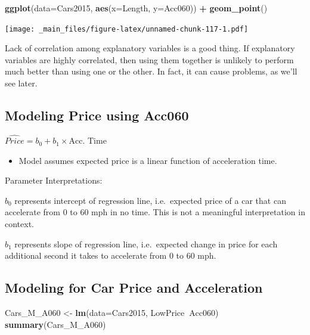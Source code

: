 \documentclass[]{book}
\newenvironment{Shaded}{\begin{snugshade}}{\end{snugshade}}
\newcommand{\KeywordTok}[1]{\textcolor[rgb]{0.13,0.29,0.53}{\textbf{#1}}}
\newcommand{\DataTypeTok}[1]{\textcolor[rgb]{0.13,0.29,0.53}{#1}}
\newcommand{\StringTok}[1]{\textcolor[rgb]{0.31,0.60,0.02}{#1}}
\newcommand{\OperatorTok}[1]{\textcolor[rgb]{0.81,0.36,0.00}{\textbf{#1}}}
\newcommand{\NormalTok}[1]{#1}
\providecommand{\tightlist}{%
  \setlength{\itemsep}{0pt}\setlength{\parskip}{0pt}}
\begin{document}
\begin{Shaded}
\begin{Highlighting}[]
\KeywordTok{ggplot}\NormalTok{(}\DataTypeTok{data=}\NormalTok{Cars2015, }\KeywordTok{aes}\NormalTok{(}\DataTypeTok{x=}\NormalTok{Length, }\DataTypeTok{y=}\NormalTok{Acc060)) }\OperatorTok{+}\StringTok{ }\KeywordTok{geom_point}\NormalTok{() }
\end{Highlighting}
\end{Shaded}

\texttt{[image: \_main\_files/figure-latex/unnamed-chunk-117-1.pdf]}

Lack of correlation among explanatory variables is a good thing. If
explanatory variables are highly correlated, then using them together is
unlikely to perform much better than using one or the other. In fact, it
can cause problems, as we'll see later.

\subsection{Modeling Price using
Acc060}\label{modeling-price-using-acc060}

\(\widehat{Price} = b_0 + b_1\times\text{Acc. Time}\)

\begin{itemize}
\tightlist
\item
  Model assumes expected price is a linear function of acceleration
  time.
\end{itemize}

Parameter Interpretations:

\(b_0\) represents intercept of regression line, i.e.~expected price of
a car that can accelerate from 0 to 60 mph in no time. This is not a
meaningful interpretation in context.

\(b_1\) represents slope of regression line, i.e.~expected change in
price for each additional second it takes to accelerate from 0 to 60
mph.

\subsection{Modeling for Car Price and
Acceleration}\label{modeling-for-car-price-and-acceleration}

\begin{Shaded}
\begin{Highlighting}[]
\NormalTok{Cars_M_A060 <-}\StringTok{ }\KeywordTok{lm}\NormalTok{(}\DataTypeTok{data=}\NormalTok{Cars2015, LowPrice}\OperatorTok{~}\NormalTok{Acc060)}
\KeywordTok{summary}\NormalTok{(Cars_M_A060)}
\end{Highlighting}
\end{Shaded}
\end{document}
